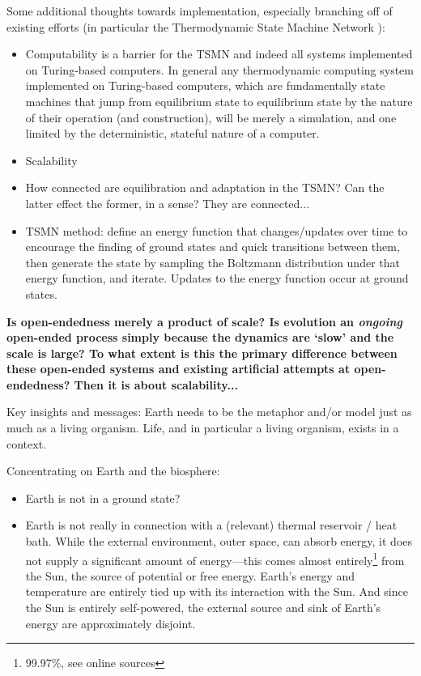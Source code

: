 \documentclass[12pt,letterpaper]{article}
\begin{document}
Some additional thoughts towards implementation, especially branching off of existing efforts (in particular the Thermodynamic State Machine Network \cite{...}):

\begin{itemize}
\item Computability is a barrier for the TSMN and indeed all systems implemented on Turing-based computers. In general any thermodynamic computing system implemented on Turing-based computers, which are fundamentally state machines that jump from equilibrium state to equilibrium state by the nature of their operation (and construction), will be merely a simulation, and one limited by the deterministic, stateful nature of a computer.
\item Scalability
\item How connected are equilibration and adaptation in the TSMN? Can the latter effect the former, in a sense? They are connected...
\item TSMN method: define an energy function that changes/updates over time to encourage the finding of ground states and quick transitions between them, then generate the state by sampling the Boltzmann distribution under that energy function, and iterate. Updates to the energy function occur at ground states.
\end{itemize}

\textbf{Is open-endedness merely a product of scale? Is evolution an \textit{ongoing} open-ended process simply because the dynamics are `slow' and the scale is large? To what extent is this the primary difference between these open-ended systems and existing artificial attempts at open-endedness? Then it is about scalability...}

Key insights and messages: Earth needs to be the metaphor and/or model just as much as a living organism. Life, and in particular a living organism, exists in a context.

Concentrating on Earth and the biosphere:
\begin{itemize}
\item Earth is not in a ground state?
\item Earth is not really in connection with a (relevant) thermal reservoir / heat bath. While the external environment, outer space, can absorb energy, it does not supply a significant amount of energy---this comes almost entirely\footnote{99.97\%, see online sources} from the Sun, the source of potential or free energy. Earth's energy and temperature are entirely tied up with its interaction with the Sun. And since the Sun is entirely self-powered, the external source and sink of Earth's energy are approximately disjoint.
\end{itemize}
\end{document}
